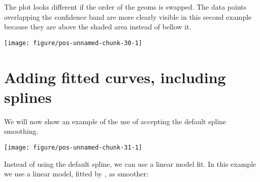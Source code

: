 \documentclass[paper=a4,10pt,div=17,headsepline,BCOR=12mm,twoside,open=right]{scrbook}\usepackage{knitr}
\begin{document}
The plot looks different if the order of the geoms is swapped. The data points overlapping the confidence band are more clearly visible in this second example because they are above the shaded area instead of bellow it.

\begin{knitrout}\footnotesize
{}\color{fgcolor}\begin{kframe}
\begin{alltt}
\hlstd{(}  \hlstd{(}  \hlstd{=} \hlopt{+}
   \hlstd{(}\hlstd{=}\hlstd{,} \hlstd{=}\hlstd{)} \hlopt{+} \hlstd{()}
\end{alltt}
\end{kframe}

{\centering \texttt{[image: figure/pos-unnamed-chunk-30-1]} 

}



\end{knitrout}

\section{Adding fitted curves, including splines}

We will now show an example of the use of  accepting the default spline smoothing.

\begin{knitrout}\footnotesize
{}\color{fgcolor}\begin{kframe}
\begin{alltt}
 \hlopt{+} \hlstd{(}\hlstd{=}\hlstd{)}
\end{alltt}
\end{kframe}

{\centering \texttt{[image: figure/pos-unnamed-chunk-31-1]} 

}



\end{knitrout}

Instead of using the default spline, we can use a linear model fit. In this example we use a linear model, fitted by , as smoother:
\end{document}
